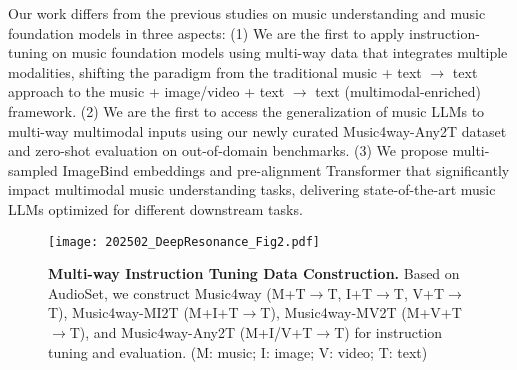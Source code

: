 Our work differs from the previous studies on music understanding and music foundation models in three aspects: (1) We are the first to apply instruction-tuning on music foundation models using multi-way data that integrates multiple modalities, shifting the paradigm from the traditional music + text $\xrightarrow{}$ text approach to the music + image/video + text $\xrightarrow{}$ text (multimodal-enriched) framework. (2) We are the first to access the generalization of music LLMs to multi-way multimodal inputs using our newly curated Music4way-Any2T dataset and zero-shot evaluation on out-of-domain benchmarks. (3) We propose multi-sampled ImageBind embeddings and pre-alignment Transformer that significantly impact multimodal music understanding tasks, delivering state-of-the-art music LLMs optimized for different downstream tasks.

\begin{figure*}[t]
    \centering
    \texttt{[image: 202502\_DeepResonance\_Fig2.pdf]}
    \caption{\textbf{Multi-way Instruction Tuning Data Construction.} Based on AudioSet, we construct Music4way (M+T$\xrightarrow{}$T, I+T$\xrightarrow{}$T, V+T$\xrightarrow{}$T), Music4way-MI2T (M+I+T$\xrightarrow{}$T), Music4way-MV2T (M+V+T$\xrightarrow{}$T), and Music4way-Any2T (M+I/V+T$\xrightarrow{}$T) for instruction tuning and evaluation. (M: music; I: image; V: video; T: text)}
    \label{fig:data}
\end{figure*}